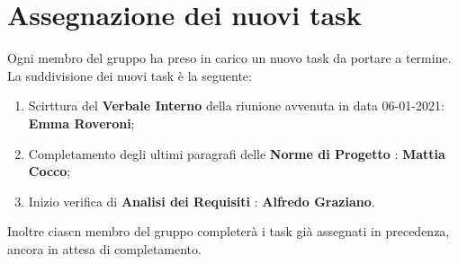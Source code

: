 	\section{Assegnazione dei nuovi task}
	Ogni membro del gruppo ha preso in carico un nuovo task da portare a termine. La suddivisione dei nuovi task è la seguente:
	\begin{enumerate}
		\item Scirttura del \textbf{Verbale Interno} della riunione avvenuta in data 06-01-2021: \textbf{Emma Roveroni};
		\item Completamento degli ultimi paragrafi delle \textbf{Norme di Progetto} : \textbf{Mattia Cocco};
		\item Inizio verifica di \textbf{Analisi dei Requisiti} : \textbf{Alfredo Graziano}.
	\end{enumerate}
	Inoltre ciascn membro del gruppo completerà i task già assegnati in precedenza, ancora in attesa di completamento.
